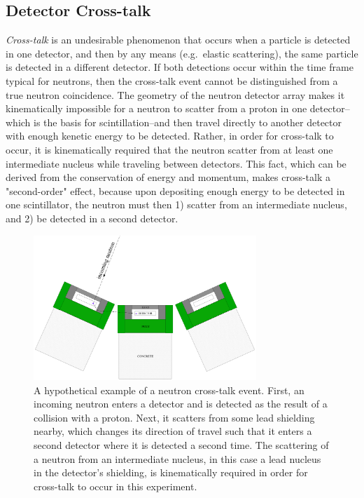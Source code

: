 \subsection{Detector Cross-talk}
\label{crosstalk}
\textit{Cross-talk} is an undesirable phenomenon that occurs when a particle is detected in one detector, and then by any means (e.g.\ elastic scattering), the same particle is detected in a different detector.
If both detections occur within the time frame typical for neutrons, then the cross-talk event cannot be distinguished from a true neutron coincidence.
The geometry of the neutron detector array makes it kinematically impossible for a neutron to scatter from a proton in one detector--which is the basis for scintillation--and then travel directly to another detector with enough kenetic energy to be detected.
Rather, in order for cross-talk to occur, it is kinematically required that the neutron scatter from at least one intermediate nucleus while traveling between detectors.
This fact, which can be derived from the conservation of energy and momentum, makes cross-talk a "second-order" effect, because upon depositing enough energy to be detected in one scintillator, the neutron must then 1) scatter from an intermediate nucleus, and 2) be detected in a second detector.
\begin{figure}
    \centering
    \includegraphics[width = 0.75\textwidth]{Content/Methods/CrossTalkExample.png}
    \caption{A hypothetical example of a neutron cross-talk event.
First, an incoming neutron enters a detector and is detected as the result of a collision with a proton.
Next, it scatters from some lead shielding nearby, which changes its direction of travel such that it enters a second detector where it is detected a second time.
The scattering of a neutron from an intermediate nucleus, in this case a lead nucleus in the detector's shielding, is kinematically required in order for cross-talk to occur in this experiment.}
    \label{fig:CrossTalkExamplepng}
\end{figure}
